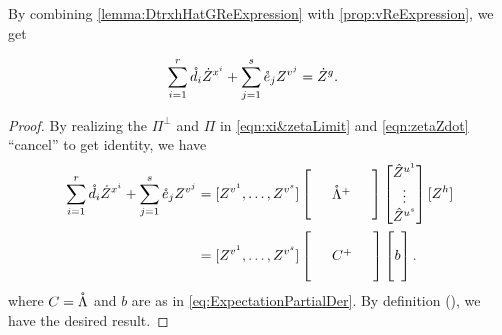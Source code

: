 \documentclass[main.tex]{subfiles}
\begin{document}
By combining \cref{lemma:DtrxhHatGReExpression} with \cref{prop:vReExpression}, we get
\begin{lemma}\label{lemma:hpartReExpression}
\begin{align*}
  \sum_{i=1}^r \mathring{d}_i \dot Z^{x^i}
  +
  \sum_{j=1}^s \mathring{e}_j  Z^{v^j}
    &=
    \dot Z^g.
\end{align*}
\end{lemma}
\begin{proof}
  By realizing the $\Pi^\perp$ and $\Pi$ in \cref{eqn:xi&zetaLimit} and \cref{eqn:zetaZdot} ``cancel'' to get identity, we have
\begin{align*}
  \sum_{i=1}^r \mathring{\dme}_i \Zdot^{\xme^i}
  +
  \sum_{j=1}^s \mathring{\eme}_j  Z^{\vme^j}
    &=
      [
         Z^{\vme^1},
        \ldots,
         Z^{\vme^s}
      ]
      \begin{bmatrix}
      \phz
        &\phz
          &\phz\\
      \phz
        &\mathring{\Lambdame }^+
          &\phz\\
      \phz
        &\phz
          &\phz
      \end{bmatrix}
      \begin{bmatrix}
      \Zhat^{\ume^1}\\
      \vdots\\
      \Zhat^{\ume^s}
      \end{bmatrix}
       [Z^{h}]
      \\
    &=
      [
         Z^{\vme^1},
        \ldots,
         Z^{\vme^s}
      ]
      \begin{bmatrix}
      \phz
        &\phz
          &\phz\\
      \phz
        &C^+
          &\phz\\
      \phz
        &\phz
          &\phz
      \end{bmatrix}
      \begin{bmatrix}
      \phz\\
      b\\
      \phz
      \end{bmatrix}
      .
  \end{align*}
where $C=\mathring {\Lambda}$ and $b$ are as in \cref{eq:ExpectationPartialDer}.
By definition (), we have the desired result.
\end{proof}
\end{document}
